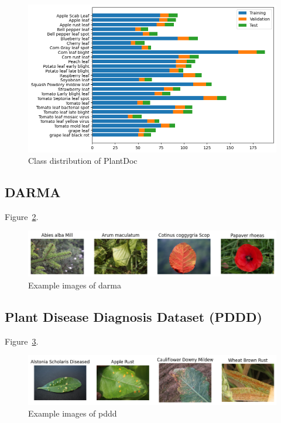 \begin{figure}[H]
    \begin{center}
    \includegraphics[width=15cm]{../images/class_distribution_of_plantdoc.png}
    \caption{Class distribution of PlantDoc}
   \label{fig:class_distribution_of_plantdoc}
    \end{center}
\end{figure}

\subsection{DARMA}

Figure~\ref{fig:example_images_of_darma}.

\begin{figure}[H]
    \begin{center}
    \includegraphics[width=15cm]{../images/example_images_of_darma.png}
    \caption{Example images of \gls{darma}}
   \label{fig:example_images_of_darma}
    \end{center}
\end{figure}

\subsection{Plant Disease Diagnosis Dataset (PDDD)}

Figure~\ref{fig:example_images_of_pddd}.

\begin{figure}[H]
    \begin{center}
    \includegraphics[width=15cm]{../images/example_images_of_pddd.png}
    \caption{Example images of \gls{pddd}}
   \label{fig:example_images_of_pddd}
    \end{center}
\end{figure}


